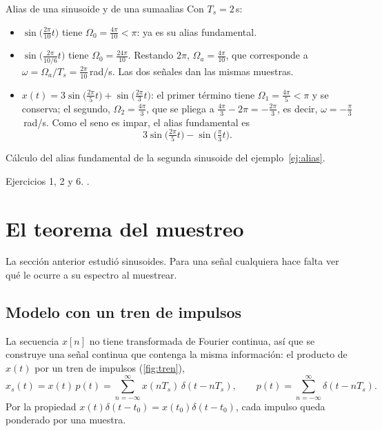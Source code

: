 \documentclass[11pt,a4paper]{scrartcl}
\begin{document}
\begin{ejemplo}{Alias de una sinusoide y de una suma}{alias}
  Con $T_s=2$\,s:
  \begin{itemize}
    \item $\sin\big(\frac{2\pi}{10}t\big)$ tiene $\Omega_0=\frac{4\pi}{10}<\pi$: ya es su alias fundamental.
    \item $\sin\big(\frac{2\pi}{10/6}t\big)$ tiene $\Omega_0=\frac{24\pi}{10}$. Restando $2\pi$, $\Omega_a=\frac{4\pi}{10}$, que corresponde a $\omega=\Omega_a/T_s=\frac{2\pi}{10}$\,rad/s. Las dos señales dan las mismas muestras.
    \item $x(t)=3\sin\big(\frac{2\pi}{5}t\big)+\sin\big(\frac{2\pi}{3}t\big)$: el primer término tiene $\Omega_1=\frac{4\pi}{5}<\pi$ y se conserva; el segundo, $\Omega_2=\frac{4\pi}{3}$, que se pliega a $\frac{4\pi}{3}-2\pi=-\frac{2\pi}{3}$, es decir, $\omega=-\frac{\pi}{3}$\,rad/s. Como el seno es impar, el alias fundamental es
    \[
      3\sin\big(\tfrac{2\pi}{5}t\big)-\sin\big(\tfrac{\pi}{3}t\big).
    \]
  \end{itemize}
\end{ejemplo}

\begin{encodigo}
  Cálculo del alias fundamental de la segunda sinusoide del ejemplo~\ref{ej:alias}.
\end{encodigo}

\begin{flushright}\small\color{pdsgris}Ejercicios 1, 2 y 6. .\end{flushright}

\section{El teorema del muestreo}\label{sec:teorema}

La sección anterior estudió sinusoides. Para una señal cualquiera hace falta ver qué le ocurre a su espectro al muestrear.

\subsection{Modelo con un tren de impulsos}

La secuencia $x[n]$ no tiene transformada de Fourier continua, así que se construye una señal continua que contenga la misma información: el producto de $x(t)$ por un tren de impulsos (\cref{fig:tren}),
\[
  x_s(t)=x(t)\,p(t)=\sum_{n=-\infty}^{\infty}x(nT_s)\,\delta(t-nT_s),\qquad p(t)=\sum_{n=-\infty}^{\infty}\delta(t-nT_s).
\]
Por la propiedad $x(t)\delta(t-t_0)=x(t_0)\delta(t-t_0)$, cada impulso queda ponderado por una muestra.
\end{document}
